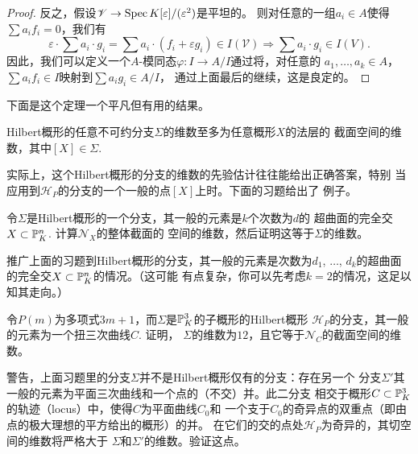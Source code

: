 \begin{proof}
反之，假设$\mathscr V\to \spec K[\varepsilon]/(\varepsilon^2)$是平坦的。
则对任意的一组$a_i\in A$使得$\sum a_if_i=0$，我们有
\[
    \varepsilon \cdot \sum a_{i} \cdot g_{i}=\sum a_{i} \cdot (f_{i}
    +\varepsilon g_{i}) \in I(\mathscr{V}) \Longrightarrow 
    \sum a_{i} \cdot g_{i} \in I(V).
\]
因此，我们可以定义一个$A$-模同态$\varphi:I\to A/I$通过将，对任意的
$a_1,\dots,a_k\in A$，$\sum a_if_i\in I$映射到$\sum a_ig_i\in A/I$，
通过上面最后的继续，这是良定的。
\end{proof}

下面是这个定理一个平凡但有用的结果。

\begin{coro}\label{coro:6.30}
Hilbert概形的任意不可约分支$\Sigma$的维数至多为任意概形$X$的法层的
截面空间的维数，其中$[X]\in \Sigma$.
\end{coro}

实际上，这个Hilbert概形的分支的维数的先验估计往往能给出正确答案，特别
当应用到$\mathscr H_P$的分支的一个一般的点$[X]$上时。下面的习题给出了
例子。

\begin{exe}\label{exe:6.31}
    令$\Sigma$是Hilbert概形的一个分支，其一般的元素是$k$个次数为$d$的
    超曲面的完全交$X\subset \P_K^n$. 计算$\mathscr N_X$的整体截面的
    空间的维数，然后证明这等于$\Sigma$的维数。
\end{exe}

\begin{exe}\label{exe:6.32}
    推广上面的习题到Hilbert概形的分支，其一般的元素是次数为$d_1$,
    $\dots$, $d_k$的超曲面的完全交$X\subset \P_K^n$的情况。（这可能
    有点复杂，你可以先考虑$k=2$的情况，这足以知其走向。）
\end{exe}

\begin{exe}\label{exe:6.33}
    令$P(m)$为多项式$3m+1$，而$\Sigma$是$\P_K^3$的子概形的Hilbert概形
    $\mathscr H_P$的分支，其一般的元素为一个扭三次曲线$C$. 证明，
    $\Sigma$的维数为$12$，且它等于$\mathscr N_C$的截面空间的维数。
\end{exe}


\begin{exe}\label{exe:6.34}
警告，上面习题里的分支$\Sigma$并不是Hilbert概形仅有的分支：存在另一个
分支$\Sigma'$其一般的元素为平面三次曲线和一个点的（不交）并。此二分支
相交于概形$C\subset \P_K^3$的轨迹（locus）中，使得$C$为平面曲线$C_0$和
一个支于$C_0$的奇异点的双重点（即由点的极大理想的平方给出的概形）的并。
在它们的交的点处$\mathscr H_P$为奇异的，其切空间的维数将严格大于
$\Sigma$和$\Sigma'$的维数。验证这点。
\end{exe}

